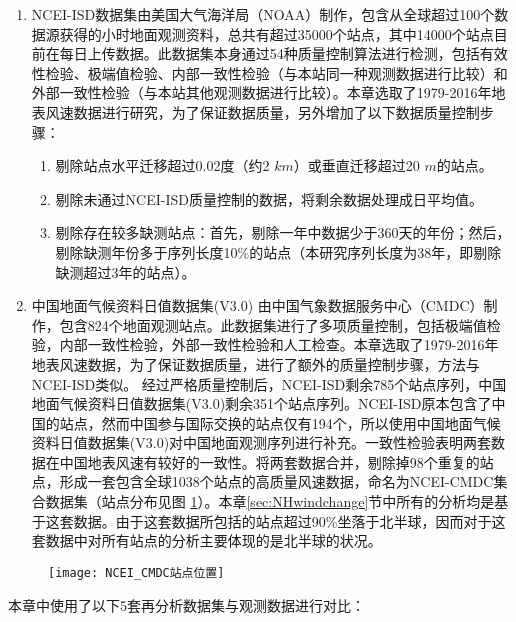 \begin{enumerate}
\item NCEI-ISD数据集\citep{smith2011the}由美国大气海洋局（NOAA）制作，包含从全球超过100个数据源获得的小时地面观测资料，总共有超过35000个站点，其中14000个站点目前在每日上传数据。此数据集本身通过54种质量控制算法进行检测，包括有效性检验、极端值检验、内部一致性检验（与本站同一种观测数据进行比较）和外部一致性检验（与本站其他观测数据进行比较）。本章选取了1979-2016年地表风速数据进行研究，为了保证数据质量，另外增加了以下数据质量控制步骤：
\begin{enumerate}
\item 剔除站点水平迁移超过0.02度（约2 $km$）或垂直迁移超过20 $m$的站点。
\item 剔除未通过NCEI-ISD质量控制的数据，将剩余数据处理成日平均值。
\item 剔除存在较多缺测站点：首先，剔除一年中数据少于360天的年份；然后，剔除缺测年份多于序列长度10\%的站点（本研究序列长度为38年，即剔除缺测超过3年的站点）。
\end{enumerate}
\item 中国地面气候资料日值数据集(V3.0) 由中国气象数据服务中心（CMDC）制作，包含824个地面观测站点。此数据集进行了多项质量控制，包括极端值检验，内部一致性检验，外部一致性检验和人工检查。本章选取了1979-2016年地表风速数据，为了保证数据质量，进行了额外的质量控制步骤，方法与NCEI-ISD类似。
经过严格质量控制后，NCEI-ISD剩余785个站点序列，中国地面气候资料日值数据集(V3.0)剩余351个站点序列。NCEI-ISD原本包含了中国的站点，然而中国参与国际交换的站点仅有194个，所以使用中国地面气候资料日值数据集(V3.0)对中国地面观测序列进行补充。一致性检验表明两套数据在中国地表风速有较好的一致性。将两套数据合并，剔除掉98个重复的站点，形成一套包含全球1038个站点的高质量风速数据，命名为NCEI-CMDC集合数据集（站点分布见图 \ref{fig:NCEI_CMDCstations}）。本章\ref{sec:NHwindchange}节中所有的分析均是基于这套数据。由于这套数据所包括的站点超过90\%坐落于北半球，因而对于这套数据中对所有站点的分析主要体现的是北半球的状况。
\end{enumerate}

\begin{figure}[!t]
    \centering
    \texttt{[image: NCEI\_CMDC站点位置]}
    \label{fig:NCEI_CMDCstations}
\end{figure}

本章中使用了以下5套再分析数据集与观测数据进行对比：

